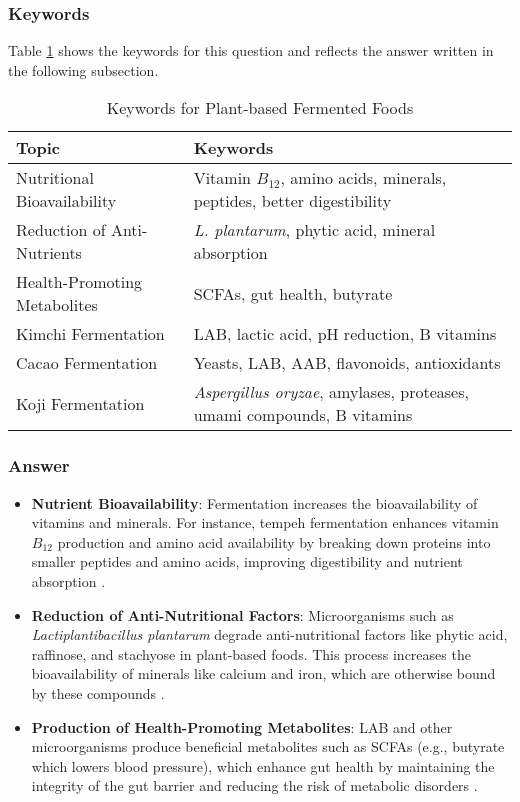 \subsubsection*{Keywords}
Table \ref{tab:KW-PlantFermented} shows the keywords for this question and reflects the answer written in the following subsection.
\begin{table}[h]
    \centering
    \caption{Keywords for Plant-based Fermented Foods} 
    \label{tab:KW-PlantFermented}
    \begin{tabularx}{\textwidth}{l|X}
        \textbf{Topic} & \textbf{Keywords} \\
        \hline
        Nutritional Bioavailability & Vitamin $B_{12}$, amino acids, minerals, peptides, better digestibility \\

        Reduction of Anti-Nutrients & \textit{L. plantarum}, phytic acid, mineral absorption \\

        Health-Promoting Metabolites & SCFAs, gut health, butyrate \\

        Kimchi Fermentation & LAB, lactic acid, pH reduction, B vitamins \\

        Cacao Fermentation & Yeasts, LAB, AAB, flavonoids, antioxidants \\

        Koji Fermentation & \textit{Aspergillus oryzae}, amylases, proteases, umami compounds, B vitamins \\
    \end{tabularx}
\end{table}

\subsubsection*{Answer}
\begin{itemize}
    \item \textbf{Nutrient Bioavailability}: Fermentation increases the bioavailability of vitamins and minerals. For instance, tempeh fermentation enhances vitamin $B_{12}$ production and amino acid availability by breaking down proteins into smaller peptides and amino acids, improving digestibility and nutrient absorption \cite*{LS22}.
    \item \textbf{Reduction of Anti-Nutritional Factors}: Microorganisms such as \textit{Lactiplantibacillus plantarum} degrade anti-nutritional factors like phytic acid, raffinose, and stachyose in plant-based foods. This process increases the bioavailability of minerals like calcium and iron, which are otherwise bound by these compounds \cite*{LS22}.
    \item \textbf{Production of Health-Promoting Metabolites}: LAB and other microorganisms produce beneficial metabolites such as SCFAs (e.g., butyrate which lowers blood pressure), which enhance gut health by maintaining the integrity of the gut barrier and reducing the risk of metabolic disorders \cite*{LS22,LS19}.
\end{itemize}

